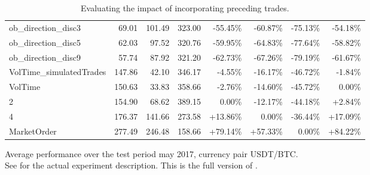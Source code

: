 \begin{table}[ht]
{\begin{tabular}{|lRRR|RRRR|}
\midrule
ob\_direction\_disc3             &     69.01 &  101.49 &  323.00 &  -55.45\% &  -60.87\% &  -75.13\% &      -54.18\% \\
ob\_direction\_disc5             &     62.03 &   97.52 &  320.76 &  -59.95\% &  -64.83\% &  -77.64\% &      -58.82\% \\
ob\_direction\_disc9             &     57.74 &   87.92 &  321.20 &  -62.73\% &  -67.26\% &  -79.19\% &      -61.67\% \\
\midrule
VolTime\_simulatedTrades &    147.86 &   42.10 &  346.17 &   -4.55\% &  -16.17\% &  -46.72\% &       -1.84\% \\
VolTime                        &    150.63 &   33.83 &  358.66 &   -2.76\% &  -14.60\% &  -45.72\% &        0.00\% \\
2                              &    154.90 &   68.62 &  389.15 &    0.00\% &  -12.17\% &  -44.18\% &        +2.84\% \\
4                              &    176.37 &  141.66 &  273.58 &   +13.86\% &    0.00\% &  -36.44\% &       +17.09\% \\
MarketOrder                    &    277.49 &  246.48 &  158.66 &   +79.14\% &   +57.33\% &    0.00\% &      +84.22\% \\
\bottomrule
\end{tabular}}

        		\caption[Full version of ]{Evaluating the impact of incorporating preceding trades.}
		\small Average performance over the test period may 2017, currency pair USDT/BTC.\\		
		See  for the actual experiment description. This is the full version of .
		\label{tab:eval:additionalMarketVariables:simulatedTrades:fulltable}
\end{table}